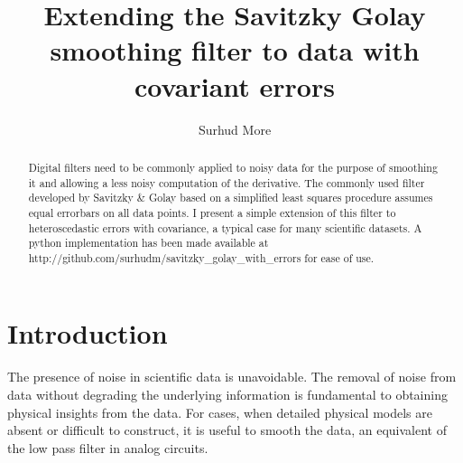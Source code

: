 \documentclass[iop, apj, onecolumn]{emulateapj}
\begin{document}


\title{Extending the Savitzky Golay smoothing filter to data with covariant
errors}
\author{
Surhud More 
}



\begin{abstract}
Digital filters need to be commonly applied to noisy data for the purpose of
smoothing it and allowing a less noisy computation of the derivative. The
commonly used filter developed by Savitzky \& Golay based on a simplified least
squares procedure assumes equal errorbars on all data points. I present a simple
extension of this filter to heteroscedastic errors with covariance, a typical
case for many scientific datasets. A python implementation has been made
available at http://github.com/surhudm/savitzky\_golay\_with\_errors for ease of use.
\end{abstract}

\keywords{}


\section{Introduction}
\label{sec:intro}

The presence of noise in scientific data is unavoidable. The removal of noise
from data without degrading the underlying information is fundamental to
obtaining physical insights from the data. For cases, when detailed physical
models are absent or difficult to construct, it is useful to smooth the data, an
equivalent of the low pass filter in analog circuits.
\end{document}
